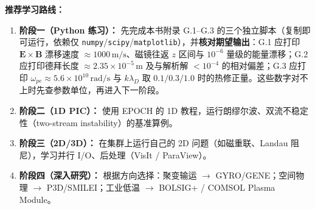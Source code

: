 \documentclass[12pt,a4paper,openany,oneside]{book}
\newcommand{\vect}[1]{\bm{#1}}
\begin{document}
\begin{tip}
\textbf{推荐学习路线：}
\begin{enumerate}
\item \textbf{阶段一（Python 练习）：} 先完成本书附录 G.1--G.3 的三个独立脚本（复制即可运行，依赖仅 \texttt{numpy}/\texttt{scipy}/\texttt{matplotlib}），并\textbf{核对期望输出}：G.1 应打印 $\vect{E}\times\vect{B}$ 漂移速度 $\approx1000\,\mathrm{m/s}$、磁镜往返 $z$ 区间与 $10^{-6}$ 量级的能量漂移；G.2 应打印德拜长度 $\approx2.35\times10^{-5}\,\mathrm{m}$ 及与解析解 $<10^{-4}$ 的相对偏差；G.3 应打印 $\omega_{pe}\approx5.6\times10^{10}\,\mathrm{rad/s}$ 与 $k\lambda_D$ 取 $0.1/0.3/1.0$ 时的热修正量。这些数字对不上时先查参数单位，再进入下一阶段。
\item \textbf{阶段二（1D PIC）：} 使用 EPOCH 的 1D 教程，运行朗缪尔波、双流不稳定性（two-stream instability）的基准算例。
\item \textbf{阶段三（2D/3D）：} 在集群上运行自己的 2D 问题（如磁重联、Landau 阻尼），学习并行 I/O、后处理（VisIt / ParaView）。
\item \textbf{阶段四（深入研究）：} 根据方向选择：聚变输运 $\to$ GYRO/GENE；空间物理 $\to$ P3D/SMILEI；工业低温 $\to$ BOLSIG+ / COMSOL Plasma Module。
\end{enumerate}
\end{tip}

\end{document}
